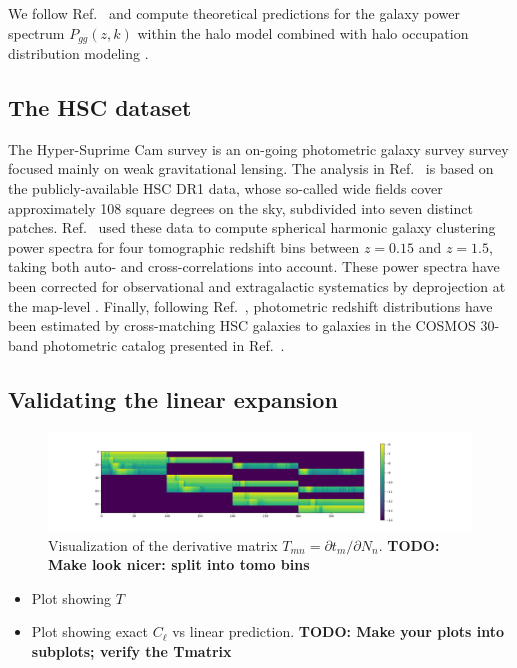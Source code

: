 \documentclass[a4paper,11pt]{article}
\newcommand{\todo}[1]{{\bf TODO: #1}}
\begin{document}
We follow Ref.~\cite{1912.08209} and compute theoretical predictions for the galaxy power spectrum $P_{gg}(z,k)$ within the halo model combined with halo occupation distribution modeling \cite{2000MNRAS.318.1144P,2002PhR...372....1C,2002ApJ...575..587B,2005ApJ...633..791Z,2013MNRAS.430..725V}. 
\subsection{The HSC dataset}
The Hyper-Suprime Cam survey is an on-going photometric galaxy survey survey focused mainly on weak gravitational lensing. The analysis in Ref.~\cite{1912.08209} is based on the publicly-available HSC DR1 data, whose so-called wide fields cover approximately 108 square degrees on the sky, subdivided into seven distinct patches. Ref.~\cite{1912.08209} used these data to compute spherical harmonic galaxy clustering power spectra for four tomographic redshift bins between $z=0.15$ and $z=1.5$, taking both auto- and cross-correlations into account. These power spectra have been corrected for observational and extragalactic systematics by deprojection at the map-level \cite{2019MNRAS.484.4127A}. Finally, following Ref.~\cite{2019PASJ...71...43H}, photometric redshift distributions have been estimated by cross-matching HSC galaxies to galaxies in the COSMOS 30-band photometric catalog presented in Ref.~\cite{2016ApJS..224...24L}.
\subsection{Validating the linear expansion}


\begin{figure}[ht]
\centering  
\includegraphics[width=1.2\textwidth]{./Tmat.png}
\caption{Visualization of the derivative matrix $T_{mn} = {\partial t_m}/{\partial N_n}$. \todo{Make look nicer: split into tomo bins}} 
\label{fig:Tmat}
\end{figure}

\begin{itemize}
  \item Plot showing $T$
  \item Plot showing exact $C_\ell$ vs linear prediction. \todo{Make your plots into subplots; verify the Tmatrix}
\end{itemize}{}
\end{document}
